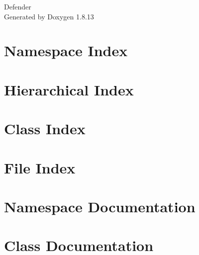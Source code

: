 \documentclass[twoside]{book}
\newcommand{\+}{\discretionary{\mbox{\scriptsize$\hookleftarrow$}}{}{}}
\newcommand{\clearemptydoublepage}{%
  \newpage{\pagestyle{empty}\cleardoublepage}%
}
\begin{document}
\hypersetup{pageanchor=false,
             bookmarksnumbered=true,
             pdfencoding=unicode
            }
\begin{titlepage}
\vspace*{7cm}
\begin{center}%
{\Large Defender }\\
\vspace*{1cm}
{\large Generated by Doxygen 1.8.13}\\
\end{center}
\end{titlepage}
\clearemptydoublepage
{}
\tableofcontents
\clearemptydoublepage
{}
\hypersetup{pageanchor=true}

\chapter{Namespace Index}

\chapter{Hierarchical Index}

\chapter{Class Index}

\chapter{File Index}

\chapter{Namespace Documentation}







\chapter{Class Documentation}


























\end{document}
